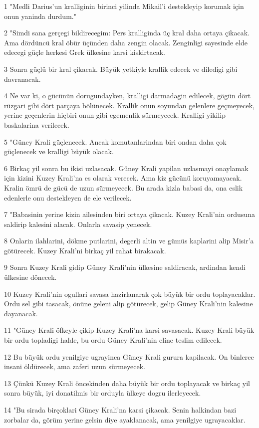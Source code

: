 \par 1 "Medli Darius'un kralliginin birinci yilinda Mikail'i destekleyip korumak için onun yaninda durdum."
\par 2 "Simdi sana gerçegi bildirecegim: Pers kralliginda üç kral daha ortaya çikacak. Ama dördüncü kral öbür üçünden daha zengin olacak. Zenginligi sayesinde elde edecegi güçle herkesi Grek ülkesine karsi kiskirtacak.
\par 3 Sonra güçlü bir kral çikacak. Büyük yetkiyle krallik edecek ve diledigi gibi davranacak.
\par 4 Ne var ki, o gücünün dorugundayken, kralligi darmadagin edilecek, gögün dört rüzgari gibi dört parçaya bölünecek. Krallik onun soyundan gelenlere geçmeyecek, yerine geçenlerin hiçbiri onun gibi egemenlik sürmeyecek. Kralligi yikilip baskalarina verilecek.
\par 5 "Güney Krali güçlenecek. Ancak komutanlarindan biri ondan daha çok güçlenecek ve kralligi büyük olacak.
\par 6 Birkaç yil sonra bu ikisi uzlasacak. Güney Krali yapilan uzlasmayi onaylamak için kizini Kuzey Krali'na es olarak verecek. Ama kiz gücünü koruyamayacak. Kralin ömrü de gücü de uzun sürmeyecek. Bu arada kizla babasi da, ona eslik edenlerle onu destekleyen de ele verilecek.
\par 7 "Babasinin yerine kizin ailesinden biri ortaya çikacak. Kuzey Krali'nin ordusuna saldirip kalesini alacak. Onlarla savasip yenecek.
\par 8 Onlarin ilahlarini, dökme putlarini, degerli altin ve gümüs kaplarini alip Misir'a götürecek. Kuzey Krali'ni birkaç yil rahat birakacak.
\par 9 Sonra Kuzey Krali gidip Güney Krali'nin ülkesine saldiracak, ardindan kendi ülkesine dönecek.
\par 10 Kuzey Krali'nin ogullari savasa hazirlanarak çok büyük bir ordu toplayacaklar. Ordu sel gibi tasacak, önüne geleni alip götürecek, gelip Güney Krali'nin kalesine dayanacak.
\par 11 "Güney Krali öfkeyle çikip Kuzey Krali'na karsi savasacak. Kuzey Krali büyük bir ordu topladigi halde, bu ordu Güney Krali'nin eline teslim edilecek.
\par 12 Bu büyük ordu yenilgiye ugrayinca Güney Krali gurura kapilacak. On binlerce insani öldürecek, ama zaferi uzun sürmeyecek.
\par 13 Çünkü Kuzey Krali öncekinden daha büyük bir ordu toplayacak ve birkaç yil sonra büyük, iyi donatilmis bir orduyla ülkeye dogru ilerleyecek.
\par 14 "Bu sirada birçoklari Güney Krali'na karsi çikacak. Senin halkindan bazi zorbalar da, görüm yerine gelsin diye ayaklanacak, ama yenilgiye ugrayacaklar.
